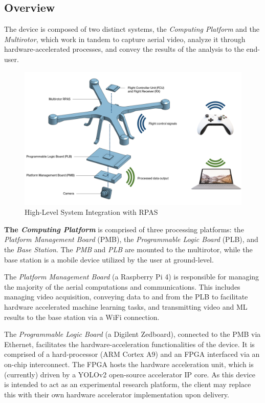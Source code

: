 \subsection{Overview}
The device is composed of two distinct systems, the \textit{Computing Platform} and the \textit{Multirotor}, which work in tandem to capture aerial video, analyze it through hardware-accelerated processes, and convey the results of the analysis to the end-user. 

\begin{figure}[H]\label{hlpic}
    \centering
    \includegraphics[width=\linewidth]{img/intpic.png}
\caption{High-Level System Integration with RPAS}
\end{figure}

\textbf{The \textit{Computing Platform}} is comprised of three processing platforms: the \textit{Platform Management Board} (PMB), the \textit{Programmable Logic Board} (PLB), and the \textit{Base Station}. The \textit{PMB} and \textit{PLB} are mounted to the multirotor, while the base station is a mobile device utilized by the user at ground-level.

The \textit{Platform Management Board} (a Raspberry Pi 4) is responsible for managing the majority of the aerial computations and communications. This includes managing video acquisition, conveying data to and from the PLB to facilitate hardware accelerated machine learning tasks, and transmitting video and ML results to the base station via a WiFi connection.

The \textit{Programmable Logic Board} (a Digilent Zedboard), connected to the PMB via Ethernet, facilitates the hardware-acceleration functionalities of the device. It is comprised of a hard-processor (ARM Cortex A9) and an FPGA interfaced via an on-chip interconnect. The FPGA hosts the hardware acceleration unit, which is (currently) driven by a YOLOv2 open-source accelerator IP core. As this device is intended to act as an experimental research platform, the client may replace this with their own hardware accelerator implementation upon delivery.

